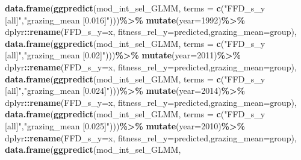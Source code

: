 \documentclass[
]{article}
\newenvironment{Shaded}{\begin{snugshade}}{\end{snugshade}}
\newcommand{\DataTypeTok}[1]{\textcolor[rgb]{0.13,0.29,0.53}{#1}}
\newcommand{\DecValTok}[1]{\textcolor[rgb]{0.00,0.00,0.81}{#1}}
\newcommand{\KeywordTok}[1]{\textcolor[rgb]{0.13,0.29,0.53}{\textbf{#1}}}
\newcommand{\NormalTok}[1]{#1}
\newcommand{\OperatorTok}[1]{\textcolor[rgb]{0.81,0.36,0.00}{\textbf{#1}}}
\newcommand{\StringTok}[1]{\textcolor[rgb]{0.31,0.60,0.02}{#1}}
\begin{document}
\begin{Shaded}
\begin{Highlighting}[]
    \KeywordTok{data.frame}\NormalTok{(}\KeywordTok{ggpredict}\NormalTok{(mod\_int\_sel\_GLMM,}
                         \DataTypeTok{terms =} \KeywordTok{c}\NormalTok{(}\StringTok{"FFD\_s\_y [all]"}\NormalTok{,}\StringTok{"grazing\_mean [0.016]"}\NormalTok{)))}\OperatorTok{\%\textgreater{}\%}
\StringTok{      }\KeywordTok{mutate}\NormalTok{(}\DataTypeTok{year=}\DecValTok{1992}\NormalTok{)}\OperatorTok{\%\textgreater{}\%}
\StringTok{      }\NormalTok{dplyr}\OperatorTok{::}\KeywordTok{rename}\NormalTok{(}\DataTypeTok{FFD\_s\_y=}\NormalTok{x, }\DataTypeTok{fitness\_rel\_y=}\NormalTok{predicted,}\DataTypeTok{grazing\_mean=}\NormalTok{group),}
    \KeywordTok{data.frame}\NormalTok{(}\KeywordTok{ggpredict}\NormalTok{(mod\_int\_sel\_GLMM,}
                         \DataTypeTok{terms =} \KeywordTok{c}\NormalTok{(}\StringTok{"FFD\_s\_y [all]"}\NormalTok{,}\StringTok{"grazing\_mean [0.02]"}\NormalTok{)))}\OperatorTok{\%\textgreater{}\%}
\StringTok{      }\KeywordTok{mutate}\NormalTok{(}\DataTypeTok{year=}\DecValTok{2011}\NormalTok{)}\OperatorTok{\%\textgreater{}\%}
\StringTok{      }\NormalTok{dplyr}\OperatorTok{::}\KeywordTok{rename}\NormalTok{(}\DataTypeTok{FFD\_s\_y=}\NormalTok{x, }\DataTypeTok{fitness\_rel\_y=}\NormalTok{predicted,}\DataTypeTok{grazing\_mean=}\NormalTok{group),}
    \KeywordTok{data.frame}\NormalTok{(}\KeywordTok{ggpredict}\NormalTok{(mod\_int\_sel\_GLMM,}
                         \DataTypeTok{terms =} \KeywordTok{c}\NormalTok{(}\StringTok{"FFD\_s\_y [all]"}\NormalTok{,}\StringTok{"grazing\_mean [0.024]"}\NormalTok{)))}\OperatorTok{\%\textgreater{}\%}
\StringTok{      }\KeywordTok{mutate}\NormalTok{(}\DataTypeTok{year=}\DecValTok{2014}\NormalTok{)}\OperatorTok{\%\textgreater{}\%}
\StringTok{      }\NormalTok{dplyr}\OperatorTok{::}\KeywordTok{rename}\NormalTok{(}\DataTypeTok{FFD\_s\_y=}\NormalTok{x, }\DataTypeTok{fitness\_rel\_y=}\NormalTok{predicted,}\DataTypeTok{grazing\_mean=}\NormalTok{group),}
    \KeywordTok{data.frame}\NormalTok{(}\KeywordTok{ggpredict}\NormalTok{(mod\_int\_sel\_GLMM,}
                         \DataTypeTok{terms =} \KeywordTok{c}\NormalTok{(}\StringTok{"FFD\_s\_y [all]"}\NormalTok{,}\StringTok{"grazing\_mean [0.025]"}\NormalTok{)))}\OperatorTok{\%\textgreater{}\%}
\StringTok{      }\KeywordTok{mutate}\NormalTok{(}\DataTypeTok{year=}\DecValTok{2010}\NormalTok{)}\OperatorTok{\%\textgreater{}\%}
\StringTok{      }\NormalTok{dplyr}\OperatorTok{::}\KeywordTok{rename}\NormalTok{(}\DataTypeTok{FFD\_s\_y=}\NormalTok{x, }\DataTypeTok{fitness\_rel\_y=}\NormalTok{predicted,}\DataTypeTok{grazing\_mean=}\NormalTok{group),}
    \KeywordTok{data.frame}\NormalTok{(}\KeywordTok{ggpredict}\NormalTok{(mod\_int\_sel\_GLMM,}

\end{Highlighting}
\end{Shaded}
\end{document}

